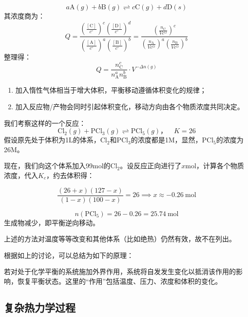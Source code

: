 $$a\text{A}(g) + b\text{B}(g) \rightleftharpoons c\text{C}(g) + d\text{D}(s)$$
其浓度商为：
$$Q = \frac{\left(\frac{[\text{C}]}{c^\circ}\right)^c \left(\frac{[\text{D}]}{c^\circ}\right)^d}{\left(\frac{[\text{A}]}{c^\circ}\right)^a \left(\frac{[\text{B}]}{c^\circ}\right)^b} = \frac{\left(\frac{n_{\text{C}}}{V c^\ominus}\right)^c}{\left(\frac{n_{\text{A}}}{V c^\ominus}\right)^a \left(\frac{n_{\text{B}}}{V c^\ominus}\right)^b}$$
整理得：
$$Q = \frac{n_{\text{C}}^c}{n_{\text{A}}^a n_{\text{B}}^b} \cdot V^{-\Delta n(g)}$$

\begin{proposition}[浓度和惰性气体对平衡的影响]
\begin{enumerate}
    \item 加入惰性气体相当于增大体积，平衡移动遵循体积变化的规律；
    \item 加入反应物/产物会同时引起体积变化，移动方向由各个物质浓度共同决定。
\end{enumerate}
\end{proposition}

\begin{example}[加入反应物平衡逆移的例子]
我们考察这样的一个反应：
$$\text{Cl}_2(g) + \text{PCl}_3(g) \rightleftharpoons  \text{PCl}_5(g)，\quad K = 26$$
假设原先处于体积为1$\mathrm{L}$的体系，$\text{Cl}_2$和$\text{PCl}_3$的浓度都是1$\mathrm{M}$，显然，$\text{PCl}_5$的浓度为26$\mathrm{M}$。

现在，我们向这个体系加入99$\mathrm{mol}$的$\text{Cl}_2$。设反应正向进行了$x \mathrm{mol}$，计算各个物质浓度，代入$K_c$，约去体积得：

$$\frac{(26+x)(127-x)}{(1-x)(100-x)} = 26 \implies x \approx -0.26\ \mathrm{mol}$$

$$n(\text{PCl}_5) = 26 - 0.26 = 25.74\ \mathrm{mol}$$
生成物减少，即平衡逆向移动。
\end{example}

上述的方法对温度等等改变和其他体系（比如绝热）仍然有效，故不在列出。

根据如上的讨论，可以总结为如下的原理：

\begin{proposition}
若对处于化学平衡的系统施加外界作用，系统将自发发生变化以抵消该作用的影响，恢复平衡状态。这里的“作用”包括温度、压力、浓度和体积的变化。
\end{proposition}

\subsection{复杂热力学过程}

